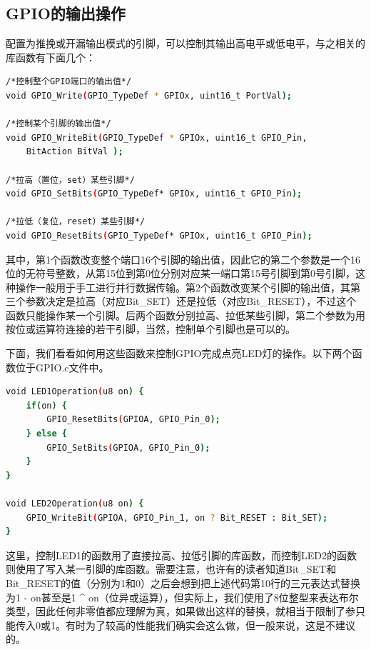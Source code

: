 	\subsection{GPIO的输出操作}
		配置为推挽或开漏输出模式的引脚，可以控制其输出高电平或低电平，与之相关的库函数有下面几个：
		\par 
		\begin{lstlisting}[language=bash, style=customStyleC]
/*控制整个GPIO端口的输出值*/
void GPIO_Write(GPIO_TypeDef * GPIOx, uint16_t PortVal);

/*控制某个引脚的输出值*/
void GPIO_WriteBit(GPIO_TypeDef * GPIOx, uint16_t GPIO_Pin, 
	BitAction BitVal );

/*拉高（置位，set）某些引脚*/
void GPIO_SetBits(GPIO_TypeDef* GPIOx, uint16_t GPIO_Pin);

/*拉低（复位，reset）某些引脚*/
void GPIO_ResetBits(GPIO_TypeDef* GPIOx, uint16_t GPIO_Pin);
		\end{lstlisting}
		\par 
		其中，第1个函数改变整个端口16个引脚的输出值，因此它的第二个参数是一个16位的无符号整数，从第15位到第0位分别对应某一端口第15号引脚到第0号引脚，这种操作一般用于手工进行并行数据传输。第2个函数改变某个引脚的输出值，其第三个参数决定是拉高（对应Bit\_SET）还是拉低（对应Bit\_RESET），不过这个函数只能操作某一个引脚。后两个函数分别拉高、拉低某些引脚，第二个参数为用按位或运算符连接的若干引脚，当然，控制单个引脚也是可以的。
		\par 
		下面，我们看看如何用这些函数来控制GPIO完成点亮LED灯的操作。以下两个函数位于GPIO.c文件中。
		\par 
		\begin{lstlisting}[language=bash, style=customStyleC, caption=LED控制操作]
void LED1Operation(u8 on) {
	if(on) {
		GPIO_ResetBits(GPIOA, GPIO_Pin_0);
	} else {
		GPIO_SetBits(GPIOA, GPIO_Pin_0);
	}
}

void LED2Operation(u8 on) {
	GPIO_WriteBit(GPIOA, GPIO_Pin_1, on ? Bit_RESET : Bit_SET);
}
		\end{lstlisting}
		\par 
		这里，控制LED1的函数用了直接拉高、拉低引脚的库函数，而控制LED2的函数则使用了写入某一引脚的库函数。需要注意，也许有的读者知道Bit\_SET和Bit\_RESET的值（分别为1和0）之后会想到把上述代码第10行的三元表达式替换为1 - on甚至是1 \^{} on（位异或运算），但实际上，我们使用了8位整型来表达布尔类型，因此任何非零值都应理解为真，如果做出这样的替换，就相当于限制了参只能传入0或1。有时为了较高的性能我们确实会这么做，但一般来说，这是不建议的。
		
